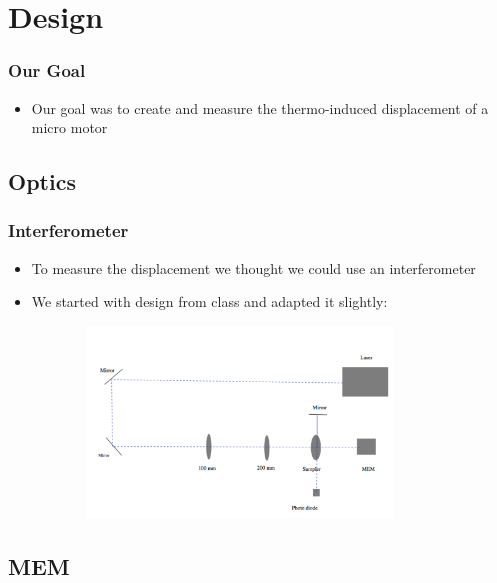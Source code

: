 \documentclass[11pt]{beamer}
\theoremstyle{definition}
\begin{document}
\section{Design} \label{sec:design}

  \begin{frame} \frametitle{Our Goal}
      \begin{itemize}
        \item Our goal was to create and measure the thermo-induced displacement of a micro motor
      \end{itemize}
  \end{frame}

  \subsection{Optics} \label{sub:optics}

    \begin{frame}[t]\frametitle{Interferometer}
      \begin{itemize}
        \item To measure the displacement we thought we could use an interferometer
        \item We started with design from class and adapted it slightly:
      \end{itemize}
      \begin{figure}[ht]
          \centering
          \includegraphics[width=4in, height=2in]{./Figures/InterferometerDesign.pdf}
          \label{fig:interferometer_design}
      \end{figure}
    \end{frame}

  \subsection{MEM} \label{sub:mem}
\end{document}
